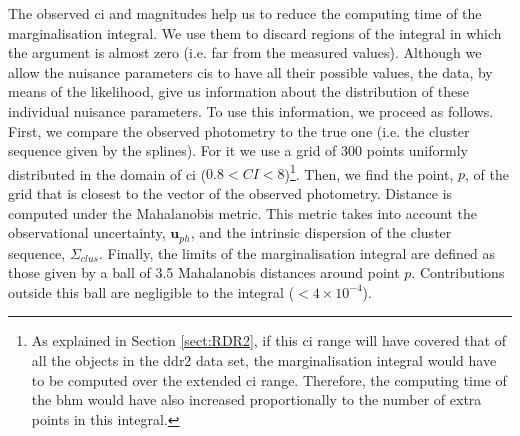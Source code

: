 The observed \gls{ci} and magnitudes help us  to reduce the computing time of the marginalisation integral. We use them to discard  regions of the integral in which the argument is almost zero (i.e. far from the measured values). Although we allow the nuisance parameters \glspl{ci} to have all their possible values, the data, by means of the likelihood, give us information about the distribution of these individual nuisance parameters. To use this information, we proceed as follows. First, we compare the observed photometry to the true one (i.e. the cluster sequence given by the splines). For it we use a grid of 300 points uniformly distributed in the domain of \gls{ci} ($0.8<CI<8$)\footnote{\label{foot:extendedCI}As explained in Section \ref{sect:RDR2}, if this \gls{ci} range will have covered that of all the objects in the \gls{ddr2} data set, the marginalisation integral would have to be computed over the extended \gls{ci} range. Therefore, the computing time of the \gls{bhm}  would have also increased proportionally to the number of extra points in this integral.}. Then, we find the point, $p$, of the grid that is closest to the vector of the observed photometry.  Distance is computed under  the Mahalanobis metric. This metric takes into account the observational uncertainty, $\mathbf{u}_{ph}$, and the intrinsic dispersion of the cluster sequence, $\Sigma_{clus}$. Finally, the limits of the marginalisation integral  are defined as those given by a ball of 3.5 Mahalanobis distances around point $p$. Contributions outside this ball are negligible to the integral ($< 4\times10^{-4}$).

